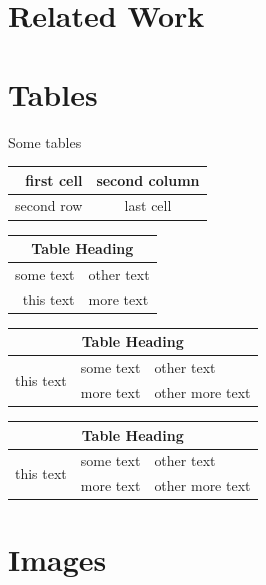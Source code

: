 \documentclass[12pt,twoside,a4paper]{article}
\begin{document}
\lipsum[1-4]

\section{Related Work}
\singlespacing

\lipsum[5-6]

\section{Tables}

Some tables

\vspace{0.2in}

\begin{tabular}{| r | c |}
\hline
first cell & second column \\
\hline
second row & last cell \\
\hline
\end{tabular}

\vspace{0.2in}

\begin{tabular}{ | r | l | }
    \hline
    \multicolumn{2}{|c|}{Table Heading} \\
    \hline
    some text & other text \\
this text & more text \\
    \hline
\end{tabular}

\vspace{0.2in}

\begin{tabular}{ | r | c | l | }
    \hline
    \multicolumn{3}{|c|}{Table Heading} \\
\hline
    \multirow{2}{*}{this text} & some text & other text \\
     & more text & other more text \\
    \hline
\end{tabular}

\vspace{0.2in}

\begin{tabularx}{\textwidth}{ | X | X | X | }
    \hline
    \multicolumn{3}{|c|}{Table Heading} \\
\hline
    \multirow{2}{*}{this text} & some text & other text \\
     & more text & other more text \\
    \hline
\end{tabularx}

\section{Images}

\setlength\fboxrule{6pt}
\setlength\fboxsep{0pt}
\end{document}
